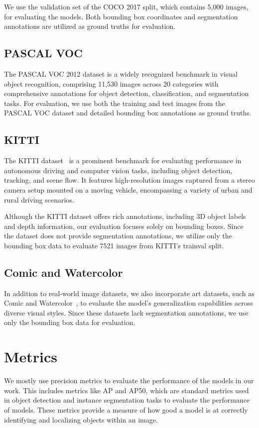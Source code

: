 We use the validation set of the COCO 2017 split, which contains 5,000 images, for evaluating the models. Both bounding box coordinates and segmentation annotations are utilized as ground truths for evaluation.

\subsection{PASCAL VOC}
The PASCAL VOC 2012 dataset is a widely recognized benchmark in visual object recognition, comprising 11,530 images across 20 categories with comprehensive annotations for object detection, classification, and segmentation tasks. For evaluation, we use both the training and test images from the PASCAL VOC dataset and detailed bounding box annotations as ground truths.

\subsection{KITTI}
The KITTI dataset~\cite{Geiger2013IJRR} is a prominent benchmark for evaluating performance in autonomous driving and computer vision tasks, including object detection, tracking, and scene flow. It features high-resolution images captured from a stereo camera setup mounted on a moving vehicle, encompassing a variety of urban and rural driving scenarios. 

Although the KITTI dataset offers rich annotations, including 3D object labels and depth information, our evaluation focuses solely on bounding boxes. Since the dataset does not provide segmentation annotations, we utilize only the bounding box data to evaluate 7521 images from KITTI’s trainval split.

\subsection{Comic and Watercolor}
In addition to real-world image datasets, we also incorporate art datasets, such as Comic and Watercolor~\cite{Inoue_2018_CVPR}, to evaluate the model's generalization capabilities across diverse visual styles. Since these datasets lack segmentation annotations, we use only the bounding box data for evaluation.

\section{Metrics}
We mostly use precision metrics to evaluate the performance of the models in our work. This includes metrics like AP and AP50, which are standard metrics used in object detection and instance segmentation tasks to evaluate the performance of models. These metrics provide a measure of how good a model is at correctly identifying and localizing objects within an image.

